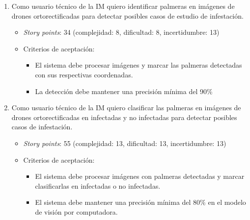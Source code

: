 \documentclass[
11pt, %
]{charter}
\begin{document}
\begin{enumerate}
  \item Como usuario técnico de la IM quiero identificar palmeras en imágenes de drones ortorectificadas para detectar posibles casos de estudio de infestación.
        \begin{itemize}
          \item \textit{Story points}: 34 (complejidad: 8, dificultad: 8, incertidumbre: 13)
          \item Criterios de aceptación:
                \begin{itemize}
                  \item El sistema debe procesar imágenes y marcar las palmeras detectadas con sus respectivas coordenadas.
                  \item La detección debe mantener una precisión mínima del 90\%
                \end{itemize}
        \end{itemize}

  \item Como usuario técnico de la IM quiero clasificar las palmeras en imágenes de drones ortorectificadas en infectadas y no infectadas para detectar posibles casos de infestación.
        \begin{itemize}
          \item \textit{Story points}: 55 (complejidad: 13, dificultad: 13, incertidumbre: 13)
          \item Criterios de aceptación:
                \begin{itemize}
                  \item El sistema debe procesar imágenes con palmeras detectadas y marcar clasificarlas en infectadas o no infectadas.
                  \item El sistema debe mantener una precisión mínima del 80\% en el modelo de visión por computadora.
                \end{itemize}
        \end{itemize}


\end{enumerate}
\end{document}
